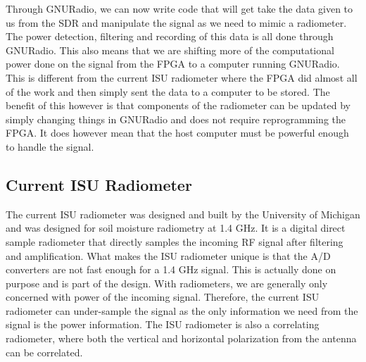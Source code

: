 Through GNURadio, we can now write code that will get take the data given to us from the SDR and manipulate the signal as we need to mimic a radiometer.  The power detection, filtering and recording of this data is all done through GNURadio.  This also means that we are shifting more of the computational power done on the signal from the FPGA to a computer running GNURadio.  This is different from the current ISU radiometer where the FPGA did almost all of the work and then simply sent the data to a computer to be stored.  The benefit of this however is that components of the radiometer can be updated by simply changing things in GNURadio and does not require reprogramming the FPGA.  It does however mean that the host computer must be powerful enough to handle the signal.  



\subsection{Current ISU Radiometer}
The current ISU radiometer was designed and built by the University of Michigan and was designed for soil moisture radiometry at 1.4 GHz.  It is a digital direct sample radiometer that directly samples the incoming RF signal after filtering and amplification.  What makes the ISU radiometer unique is that the A/D converters are not fast enough for a 1.4 GHz signal.  This is actually done on purpose and is part of the design.  With radiometers, we are generally only concerned with power of the incoming signal.  Therefore, the current ISU radiometer can under-sample the signal as the only information we need from the signal is the power information.  The ISU radiometer is also a correlating radiometer, where both the vertical and horizontal polarization from the antenna can be correlated.  

